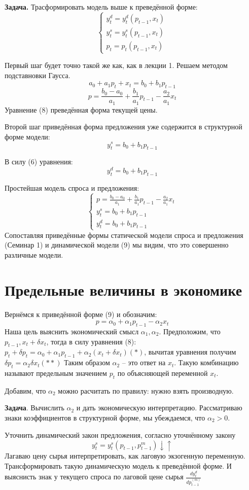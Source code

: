 \documentclass[12pt,a4paper]{article}
\begin{document}
\textbf{Задача.} Трасформировать модель выше к преведённой форме:
\begin{equation}
\begin{cases}
y_t^d = y_t^d(p_{t-1}, x_t) \\
y_t^s = y_t^s(p_{t-1}, x_t) \\
p_t = p_t(p_{t-1}, x_t)
\end{cases}
\end{equation}

Первый шаг будет точно такой же как, как в лекции 1. Решаем методом подставновки Гаусса.
$$a_0 + a_1 p_t + x_t = b_0 + b_1 p_{t - 1}$$
\begin{equation}
p = \frac{b_0 - a_0}{a_1} + \frac{b_1}{a_1}p_{t-1} - \frac{a_2}{a_1} x_t
\end{equation}
Уравнение (8) преведённая форма текущей цены.

Второй шаг приведённая форма предложения уже содержится в структурной форме модели:
$$y_t^s = b_0 + b_1 p_{t - 1}$$

В силу (6) уравнения:
$$y_t^d = b_0 + b_1 p_{t - 1}$$

Простейшая модель спроса и предложения:
\begin{equation}
\begin{cases}
p = \frac{b_0 - a_0}{a_1} + \frac{b_1}{a_1}p_{t-1} - \frac{a_2}{a_1} x_t \\
y_t^s = b_0 + b_1 p_{t - 1} \\
y_t^d = b_0 + b_1 p_{t - 1}
\end{cases}
\end{equation}
Сопоставляя приведённые формы статической модели спроса и предложения (Семинар 1) и динамической модели (9) мы видим, что это совершенно различные модели.

\section*{Предельные величины в экономике}
Вернёмся к приведённой форме (9) и обозначим:
$$p = \alpha_0 + \alpha_1 p_{t-1} - \alpha_2 x_t$$
Наша цель выяснить экономический смысл $\alpha_1, \alpha_2$. Предположим, что $p_{t - 1}, x_t + \delta x_t$, тогда в силу уравнения (8): $p_t + \delta p_t = \alpha_0 + \alpha_1 p_{t-1} + \alpha_2(x_t + \delta x_t) (*)$, вычитая уравнения получим $\delta p_t = \alpha_2 \delta x_t (**)$
Таким образом $\alpha_2$ -- это ответ на $x_t$. Такую комбинацию называют предельным значением $p_t$ по объясняющей переменной $x_t$. 

Добавим, что $\alpha_2$ можно расчитать по правилу: нужно взять производную.

\textbf{Задача}. Вычислить $\alpha_2$ и дать экономическую интерпретацию. Рассматриваю знаки коэффициентов в структурной форме, мы убеждаемся, что $\alpha_2 > 0$.

 Уточнить динамический закон предложения, согласно уточнённому закону
$$y_t^s = y_t^s(p_{t-1}, p_{t-1}^{m}) \downarrow \uparrow $$
Лагаваю цену сырья интерпретировать, как лаговую экзогенную переменную. Трансформировать такую динамическую модель к преведённой форме. И выяснисть знак у текущего спроса по лаговой цене сырья $\displaystyle{\frac{d y_t^d}{d p_{t-1}^{(m)}}}$
\end{document}
